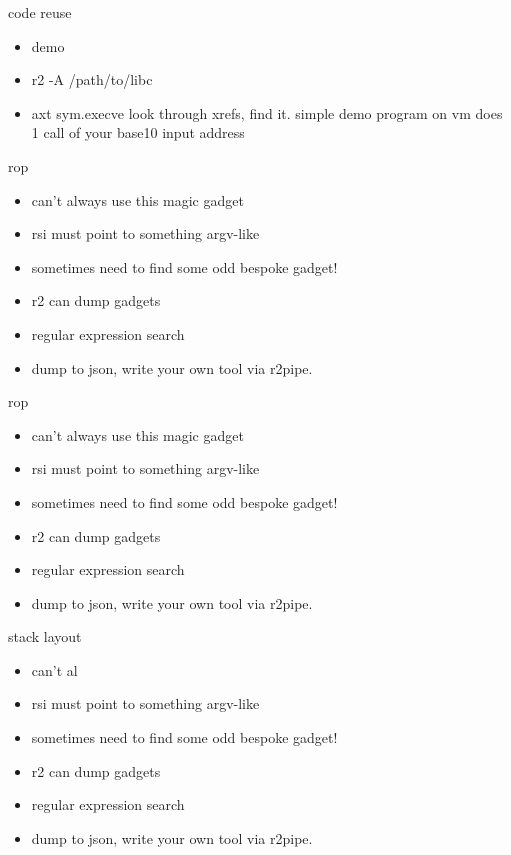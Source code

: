 \documentclass[10pt,pdf,utf8,english,compress,hyperref={unicode}]{beamer}
\begin{document}
\begin{frame}{code reuse}
	\begin{itemize}
		\item demo
		\item r2 -A /path/to/libc
		\item axt sym.execve
		\look look through xrefs, find it.
		\look simple demo program on vm does 1 call of your base10 input address
	\end{itemize}
\end{frame}

\begin{frame}{rop}
	\begin{itemize}
		\item can't always use this magic gadget
		\item rsi must point to something argv-like
		\item sometimes need to find some odd bespoke gadget!
		\item r2 can dump gadgets
		\item regular expression search
		\item dump to json, write your own tool via r2pipe.
	\end{itemize}
\end{frame}

\begin{frame}{rop}
	\begin{itemize}
		\item can't always use this magic gadget
		\item rsi must point to something argv-like
		\item sometimes need to find some odd bespoke gadget!
		\item r2 can dump gadgets
		\item regular expression search
		\item dump to json, write your own tool via r2pipe.
	\end{itemize}
\end{frame}

\begin{frame}{stack layout}
	\begin{itemize}
		\item can't al
		\item rsi must point to something argv-like
		\item sometimes need to find some odd bespoke gadget!
		\item r2 can dump gadgets
		\item regular expression search
		\item dump to json, write your own tool via r2pipe.
	\end{itemize}
\end{frame}
\end{document}
